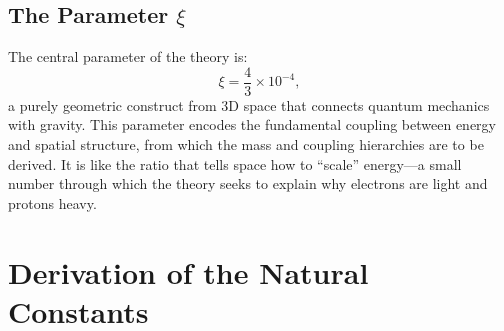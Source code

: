 	\subsection{The Parameter $\xi$}
	The central parameter of the theory is:
	\[
	\xi = \frac{4}{3} \times 10^{-4},
	\]
	a purely geometric construct from 3D space that connects quantum mechanics with gravity. This parameter encodes the fundamental coupling between energy and spatial structure, from which the mass and coupling hierarchies are to be derived. It is like the ratio that tells space how to ``scale'' energy—a small number through which the theory seeks to explain why electrons are light and protons heavy.
	
	\section{Derivation of the Natural Constants}
